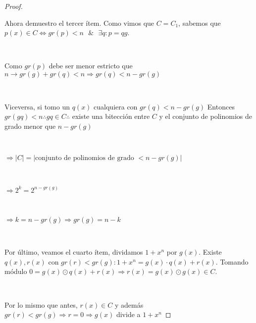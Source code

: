 \documentclass[11pt]{article}
\begin{document}
\begin{proof}
\begin{enumerate}
\end{enumerate}

Ahora demuestro el tercer ítem. Como vimos que $C = C_1$, sabemos que $p(x) \in C \iff gr(p) < n \text{ } \& \text{ } \exists q: p = qg$.\par
\

Como $gr(p)$ debe ser menor estricto que $n \rightarrow gr(g) + gr(q) < n \Rightarrow gr(q) < n - gr(g)$ \par
\

Viceversa, si tomo un $q(x)$ cualquiera con $gr(q) < n - gr(g)$ Entonces $gr(gq) < n \therefore gq \in C \therefore$ existe una bitección entre $C$ y el conjunto de polinomios de grado menor que $n - gr(g)$\par
\

$\Rightarrow |C| = |\text{conjunto de polinomios de grado } < n - gr(g)|$\par
\

$\Rightarrow 2^{k} = 2^{n -gr(g)}$\par
\

$\Rightarrow k = n - gr(g) \Rightarrow gr(g) = n - k$\par
\

Por último, veamos el cuarto ítem, dividamos $1 + x^{n}$ por $g(x)$. Existe $q(x), r(x)$ con $gr(r) < gr(g): 1 + x^{n} = g(x) \cdot q(x) + r(x)$. Tomando módulo $0 = g(x) \odot q(x) + r(x) \Rightarrow r(x) = g(x) \odot g(x) \in C$.\par
\

Por lo mismo que antes, $r(x) \in C$ y además $gr(r) < gr(g) \Rightarrow r = 0 \Rightarrow g(x)$ divide a $1 + x^{n}$
\end{proof}
\end{document}
